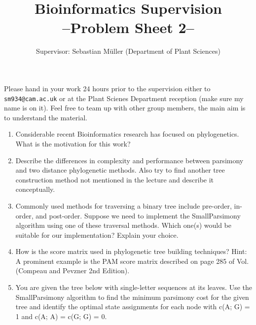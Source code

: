 \documentclass[11pt,runningheads,a4paper]{article}
\begin{document}

\title{{\LARGE Bioinformatics Supervision}\\
{\Large --Problem Sheet 2--}} 
\author{Supervisor: Sebastian Müller (Department of Plant Sciences)}
\date{}

\maketitle

Please hand in your work 24 hours prior to the supervision either to \texttt{sm934@cam.ac.uk} or at the Plant Scienes Department reception (make sure my name is on it). Feel free to team up with other group members, the main aim is to understand the material. 
\begin{enumerate}
	\item Considerable recent Bioinformatics research has focused on phylogenetics. What is the motivation for this work? 
	\item Describe the differences in complexity and performance between parsimony and two distance phylogenetic methods. Also try to find another tree construction method not mentioned in the lecture and describe it conceptually. 
  \item Commonly used methods for traversing a binary tree include pre-order, in-order, and post-order.  Suppose we need to implement the SmallParsimony algorithm using one of these traversal methods. Which one(s) would be suitable for our implementation? Explain your choice. 
  \item  How is the score matrix used in phylogenetic tree building techniques? Hint: A prominent example is the PAM score matrix described on page 285 of Vol. (Compeau and Pevzner 2nd Edition).
	\item You are given the tree below with single-letter sequences at its leaves. Use the SmallParsimony algorithm to find the minimum parsimony cost for the given tree and identify the optimal state assignments for each node with c(A; G) = 1 and c(A; A) = c(G; G) = 0. 
		\begin{figure}[h]

\end{figure}
\end{enumerate}
\end{document}
